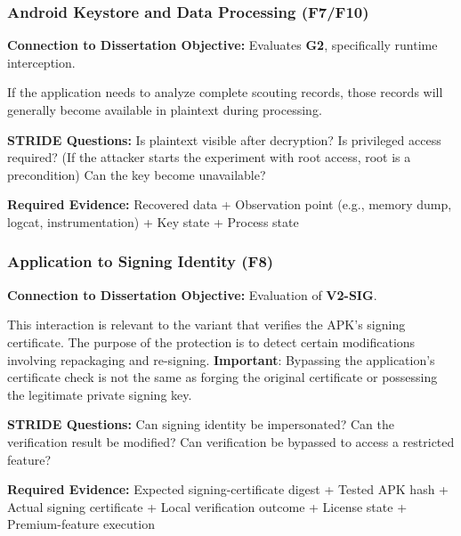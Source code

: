 \documentclass{article}
\begin{document}
\subsubsection{Android Keystore and Data Processing (F7/F10)}

\textbf{Connection to Dissertation Objective:} Evaluates \textbf{G2}, specifically runtime interception.

\medbreak

If the application needs to analyze complete scouting records, those records will generally become available in plaintext during processing.

\medbreak

\noindent\textbf{STRIDE Questions:} Is plaintext visible after decryption? Is privileged access required? (If the attacker starts the experiment with root access, root is a precondition) Can the key become unavailable?

\medbreak

\noindent\textbf{Required Evidence:} Recovered data + Observation point (e.g., memory dump, logcat, instrumentation) + Key state + Process state

\subsubsection{Application to Signing Identity (F8)}

\textbf{Connection to Dissertation Objective:}  Evaluation of \textbf{V2-SIG}.

\medbreak

This interaction is relevant to the variant that verifies the APK's signing certificate. The purpose of the protection is to detect certain modifications involving repackaging and re-signing. \textbf{Important}: Bypassing the application's certificate check is not the same as forging the original certificate or possessing the legitimate private signing key.

\medbreak

\noindent\textbf{STRIDE Questions:} Can signing identity be impersonated? Can the verification result be modified? Can verification be bypassed to access a restricted feature?

\medbreak

\noindent\textbf{Required Evidence:} Expected signing-certificate digest + Tested APK hash + Actual signing certificate + Local verification outcome + License state + Premium-feature execution

\pagebreak
\end{document}
